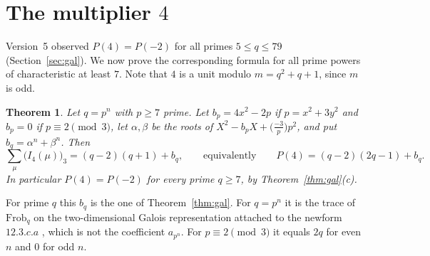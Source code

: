 \documentclass[11pt]{article}
\newtheorem{theorem}{Theorem}
\begin{document}
\section{The multiplier $4$}\label{sec:four}
Version~5 observed $P(4)=P(-2)$ for all primes $5\le q\le79$ (Section~\ref{sec:gal}). We now prove the corresponding formula for all prime powers of characteristic at least $7$.
Note that $4$ is a unit modulo $m=q^2+q+1$, since $m$ is odd.

\begin{theorem}\label{thm:four}
Let $q=p^n$ with $p\ge7$ prime. Let $b_p=4x^2-2p$ if $p=x^2+3y^2$ and $b_p=0$ if $p\equiv2\pmod3$, let $\alpha,\beta$ be the roots of $X^2-b_pX+\bigl(\tfrac{-3}{p}\bigr)p^2$, and put $b_q=\alpha^n+\beta^n$. Then
\[\sum_\mu\bigl(I_4(\mu)\bigr)_3=(q-2)(q+1)+b_q,\qquad\text{equivalently}\qquad P(4)=(q-2)(2q-1)+b_q .\]
In particular $P(4)=P(-2)$ for every prime $q\ge7$, by Theorem~\ref{thm:gal}(c).
\end{theorem}
For prime $q$ this $b_q$ is the one of Theorem~\ref{thm:gal}. For $q=p^n$ it is the trace of $\mathrm{Frob}_q$ on the two-dimensional Galois representation attached to the newform $12.3.c.a$ \cite{LM}, which is not the
coefficient $a_{p^n}$. For $p\equiv2\pmod3$ it equals $2q$ for even $n$ and $0$ for odd $n$.
\end{document}
